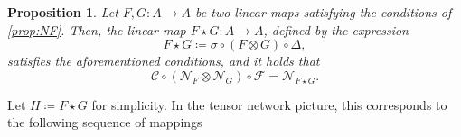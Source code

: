 \documentclass[a4paper,10pt]{amsart}
\newcommand{\Fine}{\mathcal{F}}
\newcommand{\Coarse}{\mathcal{C}}
\newcommand{\Noisy}{\mathcal{N}}
\newtheorem{proposition}[theorem]{Proposition}
\theoremstyle{definition}
\begin{document}
\begin{proposition}\label{prop:FGconv}
	Let $F,G:A\to A$ be two linear maps satisfying the conditions of \cref{prop:NF}. Then, the linear map $F\star G :A\to A$, defined by the expression
	\begin{equation} \label{eq:convMaps}
		F\star G \coloneqq \sigma \circ (F\otimes G) \circ \Delta,
	\end{equation}
    satisfies the aforementioned conditions, and it holds that
	\begin{equation}\label{eq:RenNoise}
		\Coarse \circ ({\Noisy}_{F}\otimes \Noisy_G) \circ \Fine = \Noisy_{F\star G}.
	\end{equation}
\end{proposition}
\noindent%
Let $H \coloneqq F\star G$ for simplicity. 
In the tensor network picture, this corresponds to the following sequence of mappings
\end{document}
